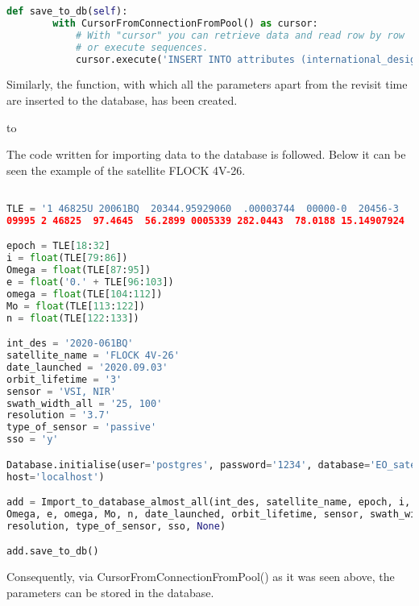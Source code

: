 \documentclass[12pt,a4paper,notitlepage,oneside,openright]{report}
\begin{document}
\begin{center}
\begin{lstlisting}[language=Python, formfeed=\newpage, extendedchars=true]
    def save_to_db(self):
        with CursorFromConnectionFromPool() as cursor:
            # With "cursor" you can retrieve data and read row by row
            # or execute sequences.
            cursor.execute('INSERT INTO attributes (international_designator,&\newline&name, epoch, inclination, raan, eccentricity, omega, mean_anomaly,&\newline&mean_motion, date_launched, orbit_lifetime, sensors, swath_width,&\newline&resolution, revisit_time, type_of_sensor) VALUES&\newline&(%s,%s,%s,%s,%s,%s,%s,%s,%s,%s,%s,%s,%s,%s,%s,%s)',&\newline&            (self.int_des, self.satellite_name, self.epoch, self.i, self.Omega,&\newline&            self.e, self.omega, self.Mo, self.n, self.date_launched,&\newline&            self.orbit_lifetime, self.sensor, self.swath_width, self.resolution,&\newline&            self.median_zerolat, self.type_of_sensor))
\end{lstlisting}
\end{center}

Similarly, the function, with which all the parameters apart from the revisit time are inserted to the database, has been created.

\def\dashfill{\cleaders\hbox{-}\hfill}
\hbox to \hsize{\dashfill\hfil}

The code written for importing data to the database is followed. Below it can be seen the example of the satellite FLOCK 4V-26.
\begin{center}
\begin{lstlisting}[language=Python, formfeed=\newpage, extendedchars=true]

TLE = '1 46825U 20061BQ  20344.95929060  .00003744  00000-0  20456-3
09995 2 46825  97.4645  56.2899 0005339 282.0443  78.0188 15.14907924  6374'

epoch = TLE[18:32]
i = float(TLE[79:86])
Omega = float(TLE[87:95])
e = float('0.' + TLE[96:103])
omega = float(TLE[104:112])
Mo = float(TLE[113:122])
n = float(TLE[122:133])

int_des = '2020-061BQ'
satellite_name = 'FLOCK 4V-26'
date_launched = '2020.09.03'
orbit_lifetime = '3'
sensor = 'VSI, NIR'
swath_width_all = '25, 100'
resolution = '3.7'
type_of_sensor = 'passive'
sso = 'y'

Database.initialise(user='postgres', password='1234', database='EO_satellites',
host='localhost')

add = Import_to_database_almost_all(int_des, satellite_name, epoch, i,
Omega, e, omega, Mo, n, date_launched, orbit_lifetime, sensor, swath_width_all,
resolution, type_of_sensor, sso, None)

add.save_to_db()
\end{lstlisting}
\end{center}

Consequently, via CursorFromConnectionFromPool() as it was seen above, the parameters can be stored in the database.

\end{document}
